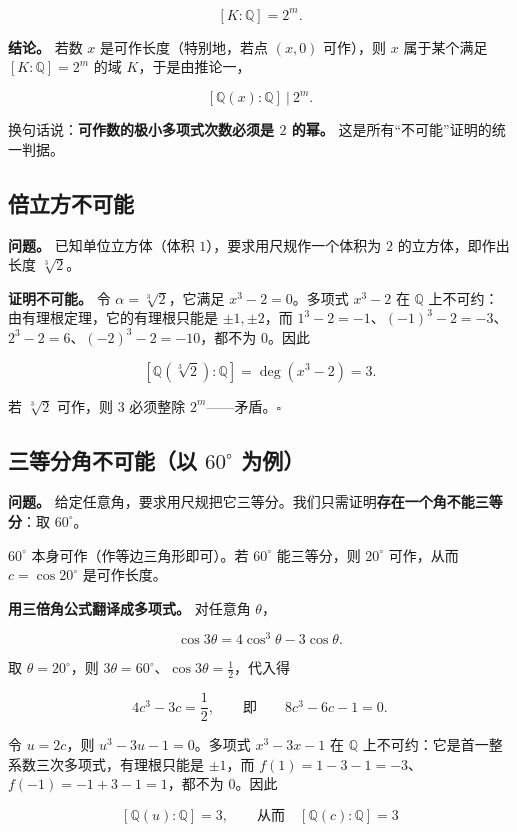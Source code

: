 \[
[K:\mathbb Q]=2^{m}.
\]

\textbf{结论。} 若数 $x$ 是可作长度（特别地，若点 $(x,0)$ 可作），则 $x$ 属于某个满足 $[K:\mathbb Q]=2^m$ 的域 $K$，于是由推论一，

\[
[\mathbb Q(x):\mathbb Q]\ \big|\ 2^{m}.
\]

换句话说：\textbf{可作数的极小多项式次数必须是 $2$ 的幂。} 这是所有“不可能”证明的统一判据。

\subsection{倍立方不可能}


\textbf{问题。} 已知单位立方体（体积 $1$），要求用尺规作一个体积为 $2$ 的立方体，即作出长度 $\sqrt[3]{2}$。

\textbf{证明不可能。} 令 $\alpha=\sqrt[3]{2}$，它满足 $x^3-2=0$。多项式 $x^3-2$ 在 $\mathbb Q$ 上不可约：由有理根定理，它的有理根只能是 $\pm1,\pm2$，而 $1^3-2=-1$、$(-1)^3-2=-3$、$2^3-2=6$、$(-2)^3-2=-10$，都不为 $0$。因此

\[
[\mathbb Q(\sqrt[3]{2}):\mathbb Q]=\deg(x^3-2)=3.
\]

若 $\sqrt[3]{2}$ 可作，则 $3$ 必须整除 $2^m$——矛盾。$\square$

\subsection{三等分角不可能（以 $60^\circ$ 为例）}


\textbf{问题。} 给定任意角，要求用尺规把它三等分。我们只需证明\textbf{存在一个角不能三等分}：取 $60^\circ$。

$60^\circ$ 本身可作（作等边三角形即可）。若 $60^\circ$ 能三等分，则 $20^\circ$ 可作，从而 $c=\cos20^\circ$ 是可作长度。

\textbf{用三倍角公式翻译成多项式。} 对任意角 $\theta$，

\[
\cos 3\theta=4\cos^3\theta-3\cos\theta .
\]

取 $\theta=20^\circ$，则 $3\theta=60^\circ$、$\cos 3\theta=\tfrac12$，代入得

\[
4c^3-3c=\frac12,
\qquad\text{即}\qquad
8c^3-6c-1=0 .
\]

令 $u=2c$，则 $u^3-3u-1=0$。多项式 $x^3-3x-1$ 在 $\mathbb Q$ 上不可约：它是首一整系数三次多项式，有理根只能是 $\pm1$，而 $f(1)=1-3-1=-3$、$f(-1)=-1+3-1=1$，都不为 $0$。因此

\[
[\mathbb Q(u):\mathbb Q]=3,\qquad\text{从而}\quad [\mathbb Q(c):\mathbb Q]=3
\]


